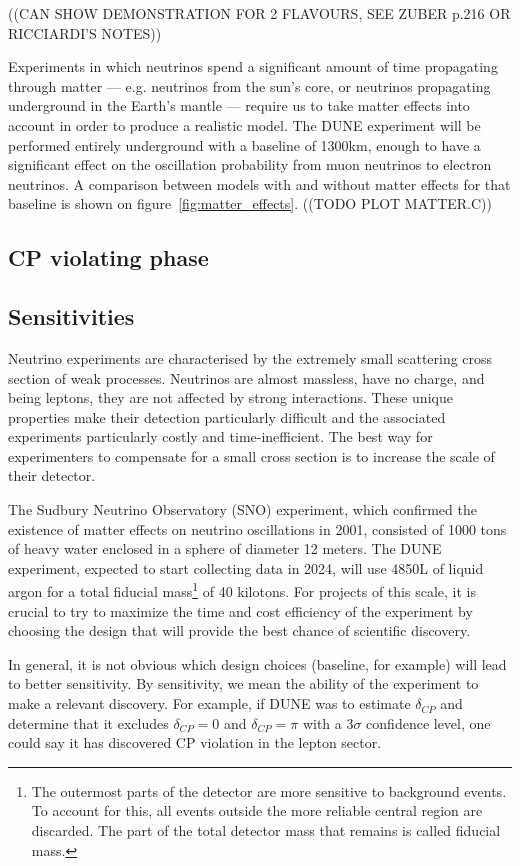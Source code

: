 \documentclass[10pt, a4paper]{article}
\begin{document}
((CAN SHOW DEMONSTRATION FOR 2 FLAVOURS, SEE ZUBER p.216 OR RICCIARDI'S
NOTES))


Experiments in which neutrinos spend a significant amount of time propagating through
matter --- e.g. neutrinos from the sun's core, or neutrinos propagating underground in the
Earth's mantle --- require us to take matter effects into account in order to produce a
realistic model. The DUNE experiment will be performed entirely underground
with a baseline of 1300km, enough to have a significant effect on the
oscillation probability from muon neutrinos to electron neutrinos. A comparison
between models with and without matter effects for that baseline is shown on
figure~\ref{fig:matter_effects}.
((TODO PLOT MATTER.C))

\subsection{CP violating phase}

\subsection{Sensitivities}
Neutrino experiments are characterised by the extremely small scattering cross
section of weak processes. Neutrinos are almost massless, have no charge, and
being leptons, they are not affected by strong interactions. These unique
properties make their detection particularly difficult and the associated
experiments particularly costly and time-inefficient. The best way for
experimenters to compensate for a small cross section is to increase the scale
of their detector. 

The Sudbury Neutrino Observatory (SNO) experiment, which confirmed
the existence of matter effects on neutrino oscillations in 2001, consisted of 1000
tons of heavy water enclosed in a sphere of diameter 12 meters\cite{thomson}.
The DUNE experiment, expected to start collecting data in 2024, will use 4850L
of liquid argon for a total fiducial mass\footnote{The outermost parts of the
detector are more sensitive to background events. To account for this, all
events outside the more reliable central region are discarded. The part of the
total detector mass that remains is called fiducial mass.} of 40 kilotons\cite{cdr}.
For projects of this scale, it is crucial to try to maximize the time and cost
efficiency of the experiment by choosing the design that will provide the best
chance of scientific discovery.

In general, it is not obvious which design choices (baseline, for example) will lead to better
sensitivity. By sensitivity, we mean the ability of the experiment to make a
relevant discovery. For example, if DUNE was to estimate $\delta_{CP}$ and
determine that it excludes $\delta_{CP}=0$ and $\delta_{CP}=\pi$ with a
$3\sigma$ confidence level, one could say it has discovered CP violation in the
lepton sector.
\end{document}
